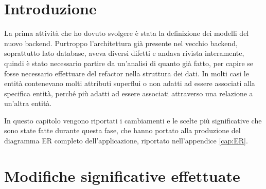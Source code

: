 \section{Introduzione}
La prima attività che ho dovuto svolgere è stata la definizione dei modelli del nuovo backend. Purtroppo l'architettura già presente nel vecchio backend, soprattutto lato database, aveva diversi difetti e andava rivista interamente, quindi è stato necessario partire da un'analisi di quanto già fatto, per capire se fosse necessario effettuare del refactor nella struttura dei dati. In molti casi le entità contenevano molti attributi superflui o non adatti ad essere associati alla specifica entità, perché più adatti ad essere associati attraverso una relazione a un'altra entità.

In questo capitolo vengono riportati i cambiamenti e le scelte più significative che sono state fatte durante questa fase, che hanno portato alla produzione del diagramma ER completo dell'applicazione, riportato nell'appendice \ref{cap:ER}.

\section{Modifiche significative effettuate}
